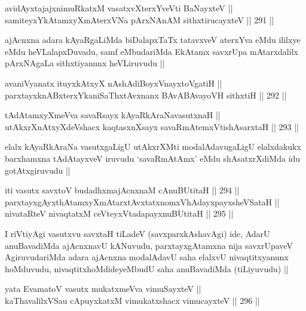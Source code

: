 \begin{shl}
avidAyxtajajxnimuRkatxM vasatxvXterxYveVti BaNayxteV || \\
samiteyxYkAtamxyXmAterxVNa pArxNAnAM sithxtirucayxteV ||  291 ||  
\end{shl}	

\begin{artha}
ajAcnxna adara kAyaRgaLiMda biDalapxTaTx tatavxveV aterxYva eMdu
ililxye eMdu heVLalapxDuvadu, samf eMbudariMda EkAtamx savxrUpa
mAtarxdalilx pArxNAgaLa sithxtiyanunx heVLiruvudu ||
\end{artha}

\begin{shl}
avaniVyanatx ituyxkAtxyX nAshAdiBoyxV\s nayxtoVgatiH || \\
parxtayxknABxterxYkaniSaThxtAvxnanx BAvABAvayoVH sithxtiH ||  292 ||  
\end{shl}



\begin{shl}
tAdAtamxyXmeVva savaRsayx kAyaRkAraNavasutxnaH || \\
utAkxrXnAtxyXdeVshacx kaqtasxnXsayx savaRmAtemxVtishAsarxtaH ||  293 ||  
\end{shl}

\begin{artha}
elalx kAyaRkAraNa vasutxgaLigU utAkxrXMti modalAdavugaLigU elalxdakukx
barxhamxna tAdAtayxveV iruvudu `savaRmAtAmx' eMdu shAsatxrXdiMda idu
gotAtxgiruvudu ||
\end{artha}

\begin{shl}
iti vasutx savxtoV budadhxmajAcnxnaM cAnuBUtitaH ||  294 ||  \\
parxtayxgAyxthAtamxyXmAtarxtAvxtatxnomxVhAdayxpayxsheVSataH || \\
nivataRteV nivaqtatxM ceVteyxVtadapayxnuBUtitaH ||  295 ||  
\end{shl}

\begin{artha}
I riVtiyAgi vasutxvu savxtaH tiLadeV (savxparxkAshavAgi) ide, AdarU
anuBavadiMda ajAcnxnavU kANuvudu, parxtayxgAtamxna nija savxrUpaveV
AgiruvudariMda adara ajAcnxna modalAdavU saha elalxvU nivaqtitxyanunx
hoMduvudu, nivaqtitxhoMdideyeMbudU saha anuBavadiMda (tiLiyuvudu) ||
\end{artha}

\begin{shl}
yata EvamatoV vasutx mukatxmeVva vimuSayxteV || \\
kaThavalilxVSau cApuyxkatxM vimukatxshacx vimucayxteV ||  296 ||  
\end{shl}

